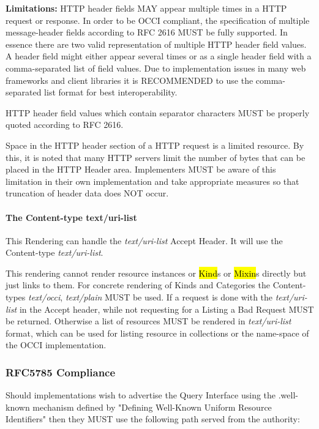 \documentclass[10pt,a4paper]{article}
\begin{document}
\textbf{Limitations: } HTTP header fields MAY appear multiple times in
a HTTP request or response. In order to be OCCI compliant, the
specification of multiple message-header fields according to RFC 2616
MUST be fully supported. In essence there are two valid representation
of multiple HTTP header field values. A header field might either
appear several times or as a single header field with a
comma-separated list of field values. Due to implementation issues in
many web frameworks and client libraries it is RECOMMENDED to use the
comma-separated list format for best interoperability.

HTTP header field values which contain separator characters MUST be
properly quoted according to RFC 2616.

Space in the HTTP header section of a HTTP request is a limited
resource. By this, it is noted that many HTTP servers limit the number
of bytes that can be placed in the HTTP Header area. Implementers MUST
be aware of this limitation in their own implementation and take
appropriate measures so that truncation of header data does NOT occur.

\paragraph{The Content-type text/uri-list}
This Rendering can handle the \textit{text/uri-list} Accept Header. It
will use the Content-type \textit{text/uri-list}.

This rendering cannot render resource instances or \hl{Kind}s or
\hl{Mixin}s directly but just links to them. For concrete rendering of
Kinds and Categories the Content-types \textit{text/occi},
\textit{text/plain} MUST be used. If a request is done with the
\textit{text/uri-list} in the Accept header, while not requesting for
a Listing a Bad Request MUST be returned. Otherwise a list of
resources MUST be rendered in \emph{text/uri-list} format, which can
be used for listing resource in collections or the name-space of the
OCCI implementation.

\subsubsection{RFC5785 Compliance}
\label{sec:rfc5785_compliance}
Should implementations wish to advertise the Query Interface using the
.well-known mechanism defined by "Defining Well-Known Uniform Resource
Identifiers" \cite{rfc5785} then they MUST use the following path
served from the authority:
\end{document}
